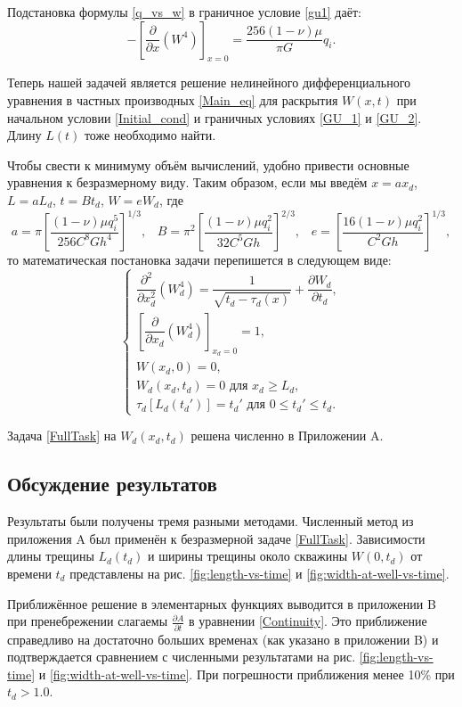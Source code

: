 \documentclass[a4paper, 11pt]{article}
\newcommand{\beq}{\begin{equation}}
\newcommand{\eeq}{\end{equation}}
\begin{document}
Подстановка формулы \eqref{q_vs_w} в граничное условие \eqref{gu1} даёт:
\beq\label{GU_2}
-\left[\frac{\partial}{\partial x}(W^4)\right]_{x=0}=\frac{256(1-\nu)\mu}{\pi G}q_i.
\eeq

Теперь нашей задачей является решение нелинейного дифференциального уравнения в частных производных \eqref{Main_eq} для раскрытия $W(x,t)$ при начальном условии \eqref{Initial_cond} и граничных условиях \eqref{GU_1} и \eqref{GU_2}.
Длину $L(t)$ тоже необходимо найти.

Чтобы свести к минимуму объём вычислений, удобно привести основные уравнения к безразмерному виду.
Таким образом, если мы введём $x=ax_{d}$, $L=aL_{d}$, $t=Bt_{d}$, $W=eW_d$, где
\beq\label{Dimensionless}
a=\pi\left[\frac{(1-\nu)\mu q_i^5}{256C^8Gh^4}\right]^{1/3},\,\,\,\,\,B=\pi^2\left[\frac{(1-\nu)\mu q_i^2}{32C^5Gh}\right]^{2/3},\,\,\,\,\,e=\left[\frac{16(1-\nu)\mu q_i^2}{C^2Gh}\right]^{1/3},
\eeq
то математическая постановка задачи перепишется в следующем виде:
\beq\label{FullTask}
\begin{cases}
\dfrac{\partial^2}{\partial x_d^2}(W_d^4)=\dfrac{1}{\sqrt{t_d-\tau_d(x)}}+\dfrac{\partial W_d}{\partial t_d},\\[15pt]
\left[\dfrac{\partial}{\partial x_d}(W_d^4)\right]_{x_d=0}=1,\\[15pt]
W(x_d,0)=0,\\[5pt]
W_d(x_d,t_d)=0\text{ для } x_d\geqslant L_d,\\[5pt]
\tau_d[L_d(t_d')]=t_d'\text{ для }0\leqslant t_d'\leqslant t_d.
\end{cases}
\eeq

Задача \eqref{FullTask} на $W_d(x_d,t_d)$ решена численно в Приложении A.


\subsection{Обсуждение результатов}

Результаты были получены тремя разными методами.
Численный метод из приложения A был применён к безразмерной задаче \eqref{FullTask}.
Зависимости длины трещины $L_d(t_d)$ и ширины трещины около скважины $W(0,t_d)$ от времени $t_d$ представлены на рис. \ref{fig:length-vs-time} и \ref{fig:width-at-well-vs-time}.

Приближённое решение в элементарных функциях выводится в приложении B при пренебрежении слагаемы $\frac{\partial A}{\partial t}$ в уравнении \eqref{Continuity}.
Это приближение справедливо на достаточно больших временах (как указано в приложении B) и подтверждается сравнением с численными результатами на рис. \ref{fig:length-vs-time} и \ref{fig:width-at-well-vs-time}.
При погрешности приближения менее 10\% при $t_d>1.0$.
\end{document}
